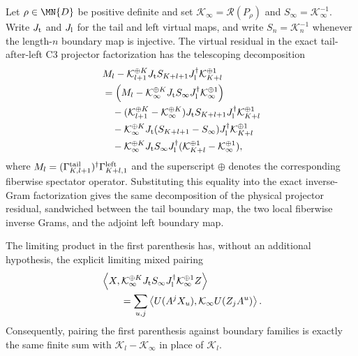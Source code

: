 \begin{lemma}%
    \label{thm:c3_projector_gram_error_telescope}
    \leanok
    Let $\rho\in\MN{D}$ be positive definite and set
    $\mathcal K_\infty=\mathscr R(P_\rho)$ and
    $S_\infty=\mathcal K_\infty^{-1}$.  Write $J_{\rm t}$ and $J_{\rm l}$
    for the tail and left virtual maps, and write $S_n=\mathcal K_n^{-1}$
    whenever the length-$n$ boundary map is injective.  The virtual residual
    in the exact tail-after-left C3 projector factorization has the telescoping
    decomposition
    \begin{align}
         & M_l-\mathcal K_{l+1}^{\oplus K}J_{\rm t}S_{K+l+1}
        J_{\rm l}^\dagger\mathcal K_{K+l}^{\oplus 1}                \\
         & =\left(M_l-\mathcal K_\infty^{\oplus K}J_{\rm t}S_\infty
        J_{\rm l}^\dagger\mathcal K_\infty^{\oplus 1}\right)        \\
         & \quad-(\mathcal K_{l+1}^{\oplus K}
        -\mathcal K_\infty^{\oplus K})J_{\rm t}S_{K+l+1}
        J_{\rm l}^\dagger\mathcal K_{K+l}^{\oplus 1}                \\
         & \quad-\mathcal K_\infty^{\oplus K}J_{\rm t}
        (S_{K+l+1}-S_\infty)J_{\rm l}^\dagger
        \mathcal K_{K+l}^{\oplus 1}                                 \\
         & \quad-\mathcal K_\infty^{\oplus K}J_{\rm t}S_\infty
        J_{\rm l}^\dagger(\mathcal K_{K+l}^{\oplus 1}
        -\mathcal K_\infty^{\oplus 1}),
    \end{align}
    where
    $M_l=(\Gamma^{\rm tail}_{K,l+1})^\dagger
        \Gamma^{\rm left}_{K+l,1}$ and the superscript $\oplus$ denotes the
    corresponding fiberwise spectator operator.  Substituting this equality
    into the exact inverse-Gram factorization gives the same decomposition of
    the physical projector residual, sandwiched between the tail boundary map,
    the two local fiberwise inverse Grams, and the adjoint left boundary map.

    The limiting product in the first parenthesis has, without an additional
    hypothesis, the explicit limiting mixed pairing
    \begin{align}
         & \left\langle X,
        \mathcal K_\infty^{\oplus K}J_{\rm t}S_\infty
        J_{\rm l}^\dagger\mathcal K_\infty^{\oplus 1}Z
        \right\rangle                    \\
         & \qquad=\sum_{u,j}\left\langle
        U(A^jX_u),\mathcal K_\infty U(Z_jA^u)\right\rangle .
    \end{align}
    Consequently, pairing the first parenthesis against boundary families is
    exactly the same finite sum with
    $\mathcal K_l-\mathcal K_\infty$ in place of $\mathcal K_l$.


\end{lemma}
